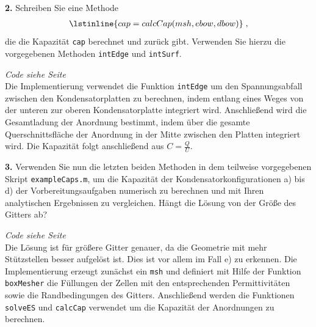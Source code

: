 \documentclass[./Protokollheft.tex]{subfiles}
\begin{document}
 \label{v4.PA.2}
\begin{framed}
	\noindent \textbf{2.} Schreiben Sie eine Methode
\begin{align}
\lstinline{cap = calcCap(msh, ebow, dbow)} \; ,
\end{align}
die die Kapazität \lstinline{cap} berechnet und zurück gibt. Verwenden Sie hierzu die vorgegebenen Methoden \lstinline{intEdge} und
\lstinline{intSurf}.\label{exer:calcCap}
\end{framed}

\textit{ Code siehe Seite \pageref{code4.2} } \\
Die Implementierung verwendet die Funktion \lstinline{intEdge} um den Spannungsabfall zwischen den Kondensatorplatten zu berechnen, indem entlang eines Weges von der unteren zur oberen Kondensatorplatte integriert wird. Anschließend wird die Gesamtladung der Anordnung bestimmt, indem über die gesamte Querschnittsfläche der Anordnung in der Mitte zwischen den Platten integriert wird. Die Kapazität folgt anschließend aus $C = \frac{Q}{U}$.

 \label{v4.PA.3}
\begin{framed}
	\noindent \textbf{3.} Verwenden Sie nun die letzten beiden Methoden in dem teilweise vorgegebenen Skript \lstinline{exampleCaps.m}, um
die Kapazität der Kondensatorkonfigurationen a) bis d) der Vorbereitungsaufgaben numerisch zu berechnen und mit Ihren analytischen Ergebnissen zu vergleichen. Hängt die Lösung von der Größe des Gitters ab?\label{exer:calcCapNumerically}
\end{framed}

\textit{ Code siehe Seite \pageref{code4.3} } \\
Die Lösung ist für größere Gitter genauer, da die Geometrie mit mehr Stützstellen besser aufgelöst ist. Dies ist vor allem im Fall e) zu erkennen.
Die Implementierung erzeugt zunächst ein \lstinline{msh} und definiert mit Hilfe der Funktion \lstinline{boxMesher} die Füllungen der Zellen mit den entsprechenden Permittivitäten sowie die Randbedingungen des Gitters. Anschließend werden die Funktionen \lstinline{solveES} und \lstinline{calcCap} verwendet um die Kapazität der Anordnungen zu berechnen.


\end{document}
